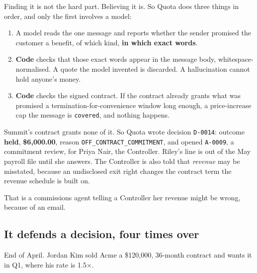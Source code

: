 \documentclass[10pt,a4paper]{article}
\newcommand{\code}[1]{{\small\texttt{#1}}}
\begin{document}
Finding it is not the hard part. Believing it is. So Quota does three things in order, and only the first involves a model:

\begin{enumerate}
\item A model reads the one message and reports whether the sender promised the customer a benefit, of which kind, \textbf{in which exact words}.
\item \textbf{Code} checks that those exact words appear in the message body, whitespace-normalised. A quote the model invented is discarded. A hallucination cannot hold anyone's money.
\item \textbf{Code} checks the signed contract. If the contract already grants what was promised \textemdash{} a termination-for-convenience window long enough, a price-increase cap \textemdash{} the message is \code{covered}, and nothing happens.
\end{enumerate}

Summit's contract grants none of it. So Quota wrote decision \code{D-0014}: outcome \textbf{held}, \textbf{\$6{,}000.00}, reason \code{OFF\_CONTRACT\_COMMITMENT}, and opened \code{A-0009}, a commitment review, for Priya Nair, the Controller. Riley's line is out of the May payroll file until she answers. The Controller is also told that \emph{revenue} may be misstated, because an undisclosed exit right changes the contract term the revenue schedule is built on.

That is a commissions agent telling a Controller her revenue might be wrong, because of an email.

\subsection{It defends a decision, four times over}

End of April. Jordan Kim sold Acme a \$120{,}000, 36-month contract and wants it in Q1, where his rate is 1.5$\times$.
\end{document}
